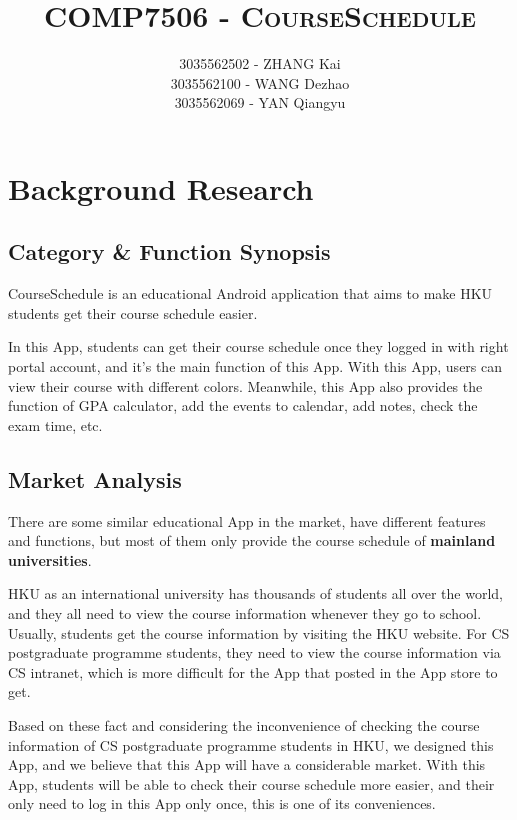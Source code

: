 \documentclass{article}
\title{\textsc{COMP7506 - CourseSchedule}}
\author{	
                3035562502 - ZHANG Kai \\
                3035562100 - WANG Dezhao \\
                3035562069 - YAN Qiangyu }
\date{}
\begin{document}
    \maketitle
    
    
    \section{Background Research}

    \subsection{Category \& Function Synopsis}
    CourseSchedule is an educational Android application that aims to 
    make HKU students get their course schedule easier.
    
    In this App, students can get their course schedule
    once they logged in with right portal account, 
    and it's the main function of this App.
    With this App, users can view their course with different colors.
    Meanwhile, this App also provides the function of GPA calculator,
    add the events to calendar, add notes, check the exam time, etc.

    \subsection{Market Analysis}
    There are some similar educational App in the market, 
    have different features and functions,
    but most of them only provide the course schedule of \textbf{mainland universities}.
    
    HKU as an international university has thousands of students 
    all over the world, and they all need to view the course information
    whenever they go to school. 
    Usually, students get the course information by visiting the HKU website.
    For CS postgraduate programme students, they need to view 
    the course information via CS intranet, which is more difficult for
    the App that posted in the App store to get.
    
    Based on these fact and considering the inconvenience of 
    checking the course information of
    CS postgraduate programme students in HKU, 
    we designed this App, and we believe that
    this App will have a considerable market.
    With this App, students will be able to check their course schedule
    more easier, and their only need to log in this App only once,
    this is one of its conveniences.
\end{document}
